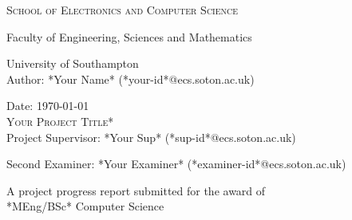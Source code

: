 
\begin{titlepage}
	
\begin{center}

\textsc{\large{School of Electronics and Computer Science}}

\large{Faculty of Engineering, Sciences and Mathematics}

\large{University of Southampton}\\[3.5cm]

\large{Author: *Your Name* (*your-id*@ecs.soton.ac.uk)}

\large{Date: \today}\\[4.0cm]

\textsc{\LARGE *Your Project Title*}\\[4.5cm] 

\large{Project Supervisor: *Your Sup* (*sup-id*@ecs.soton.ac.uk)}

\large{Second Examiner: *Your Examiner* (*examiner-id*@ecs.soton.ac.uk)}

\vfill

\large{A project progress report submitted for the award of}\\[0.0cm]

\large{*MEng/BSc* Computer Science}

\end{center}

\end{titlepage}
